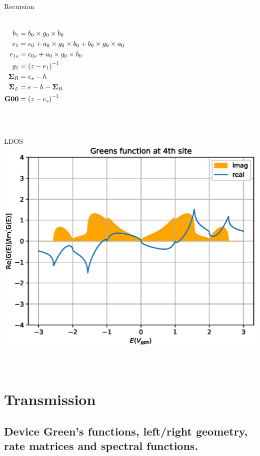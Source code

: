 \documentclass[hyperref={colorlinks=true,urlcolor=blue,linkcolor=.},aspectratio=1610,mathserif]{beamer}
\newcommand{\im}[3]{\inputminted[linenos=true, python3=true, firstline=#2, lastline=#3]{python}{#1}}
\begin{document}
\begin{frame}{Recursion}
\begin{overprint}
\begin{center}
\begin{columns}[c]
\begin{align*}
					b_1           & = b_0 \times g_0 \times b_0                                   \\
					e_1           & = e_0 + a_0 \times g_0 \times b_0 + b_0 \times g_0 \times a_0 \\
					e_{1s}        & = e_{0s} + a_0 \times g_0 \times b_0                          \\
					g_1           & = \pqty{z-e_1}^{-1}                                           \\
					\vb{\Sigma}_R & = e_s - h                                                     \\
					\vb{\Sigma}_L & = e - h - \vb{\Sigma}_R                                       \\
					\vb{G00}      & = \pqty{z-e_s}^{-1}
				\end{align*}
			\end{columns}
		\end{center}
		\begin{columns}[c]
			\column{\textwidth}
			\im{Listings/Functions.py}{92}{109}
		\end{columns}
	\end{overprint}
\end{frame}

\begin{frame}{LDOS}
	\centering
	\includegraphics[width=.55\textwidth]{Figures/BetaimrealTE.eps}
	\begin{columns}[c]
		\column{\textwidth}
		\im{Listings/SelfEnergyByRecursion.py}{64}{68}
	\end{columns}
\end{frame}

\section{Transmission}
\subsection{Device Green's functions, left/right geometry, rate matrices and spectral functions.}
\end{document}
